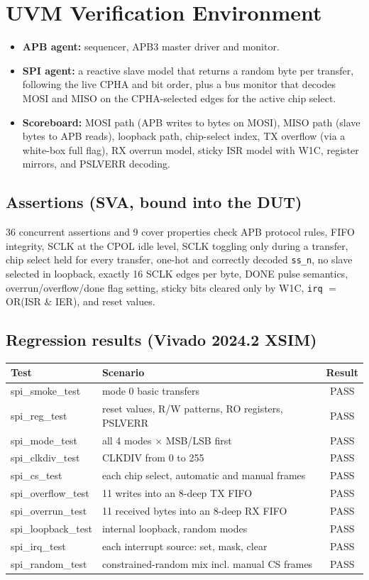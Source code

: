 \documentclass[11pt,a4paper]{article}
\newcommand{\sect}[1]{\section{\textcolor{accent}{#1}}}
\begin{document}
\sect{UVM Verification Environment}
\begin{itemize}
\item \textbf{APB agent:} sequencer, APB3 master driver and monitor.
\item \textbf{SPI agent:} a reactive slave model that returns a random byte per transfer, following the live CPHA and bit order, plus a bus monitor that decodes MOSI and MISO on the CPHA-selected edges for the active chip select.
\item \textbf{Scoreboard:} MOSI path (APB writes to bytes on MOSI), MISO path (slave bytes to APB reads), loopback path, chip-select index, TX overflow (via a white-box full flag), RX overrun model, sticky ISR model with W1C, register mirrors, and PSLVERR decoding.
\end{itemize}

\subsection*{Assertions (SVA, bound into the DUT)}
36 concurrent assertions and 9 cover properties check APB protocol rules, FIFO integrity, SCLK at the CPOL idle level, SCLK toggling only during a transfer, chip select held for every transfer, one-hot and correctly decoded \texttt{ss\_n}, no slave selected in loopback, exactly 16 SCLK edges per byte, DONE pulse semantics, overrun/overflow/done flag setting, sticky bits cleared only by W1C, \texttt{irq} $=$ OR(ISR \& IER), and reset values.

\subsection*{Regression results (Vivado 2024.2 XSIM)}
\begin{center}
\small
\begin{tabular}{lp{8.6cm}c}
\toprule
\textbf{Test} & \textbf{Scenario} & \textbf{Result}\\
\midrule
spi\_smoke\_test & mode 0 basic transfers & PASS\\
spi\_reg\_test & reset values, R/W patterns, RO registers, PSLVERR & PASS\\
spi\_mode\_test & all 4 modes $\times$ MSB/LSB first & PASS\\
spi\_clkdiv\_test & CLKDIV from 0 to 255 & PASS\\
spi\_cs\_test & each chip select, automatic and manual frames & PASS\\
spi\_overflow\_test & 11 writes into an 8-deep TX FIFO & PASS\\
spi\_overrun\_test & 11 received bytes into an 8-deep RX FIFO & PASS\\
spi\_loopback\_test & internal loopback, random modes & PASS\\
spi\_irq\_test & each interrupt source: set, mask, clear & PASS\\
spi\_random\_test & constrained-random mix incl. manual CS frames & PASS\\
\bottomrule
\end{tabular}
\end{center}
\end{document}
